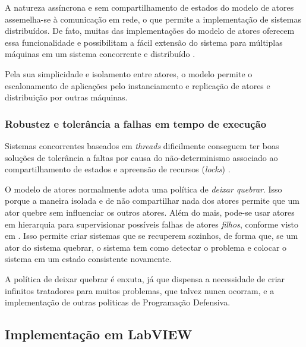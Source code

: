 A natureza assíncrona e sem compartilhamento de estados do modelo de atores assemelha-se à comunicação em rede, o que permite a implementação de sistemas distribuídos. De fato, muitas das implementações do modelo de atores oferecem essa funcionalidade e possibilitam a fácil extensão do sistema para múltiplas máquinas em um sistema concorrente e distribuído \citep{hewitt2010actor, Erb2012}. 

Pela sua simplicidade e isolamento entre atores, o modelo permite o escalonamento de aplicações pelo instanciamento e replicação de atores e distribuição por outras máquinas.

\subsubsection{Robustez e tolerância a falhas em tempo de execução}

Sistemas concorrentes baseados em \textit{threads} dificilmente conseguem ter boas soluções de tolerância a faltas por causa do não-determinismo associado ao compartilhamento de estados e apreensão de recursos (\textit{locks}) \citep{Erb2012}. 

O modelo de atores normalmente adota uma política de \textit{deixar quebrar}. Isso porque a maneira isolada e de não compartilhar nada dos atores permite que um ator quebre sem influenciar os outros atores. Além do mais, pode-se usar atores em hierarquia para supervisionar possíveis falhas de atores \textit{filhos}, conforme visto em \citet{Erb2012}. Isso permite criar sistemas que se recuperem sozinhos, de forma que, se um ator do sistema quebrar, o sistema tem como detectar o problema e colocar o sistema em um estado consistente novamente. 

A política de deixar quebrar é enxuta, já que dispensa a necessidade de criar infinitos tratadores para muitos problemas, que talvez nunca ocorram, e a implementação de outras politicas de Programação Defensiva.


\subsection{Implementação em LabVIEW}

